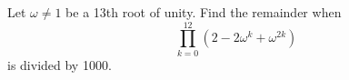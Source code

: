 Let $\omega\neq 1$ be a 13th root of unity. Find the remainder when
$$\prod_{k=0}^{12}(2-2\omega^k+\omega^{2k})$$
is divided by 1000.
